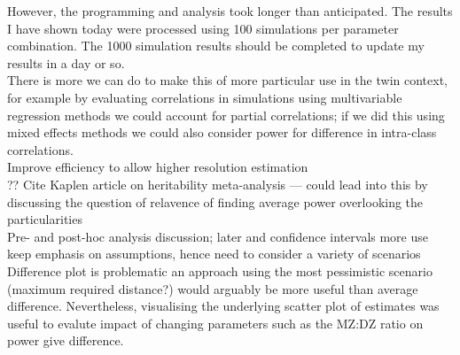 
However, the programming and analysis took longer than anticipated.  The results I have shown today were processed using 100 simulations per parameter combination.  The 1000 simulation results should be completed to update my results in a day or so.
\\
There is more we can do to make this of more particular use in the twin context, for example by evaluating correlations in simulations using multivariable regression methods we could account for partial correlations; if we did this using mixed effects methods we could also consider power for difference in intra-class correlations.
\\
Improve efficiency to allow higher resolution estimation
\\

??
Cite Kaplen article on heritability meta-analysis --- could lead into this by discussing the question of relavence of finding average power overlooking the particularities
\\
Pre- and post-hoc analysis discussion; later and confidence intervals more use
\\
keep emphasis on assumptions, hence need to consider a variety of scenarios
\\

Difference plot is problematic \; an approach using the most pessimistic scenario (maximum required distance?) would arguably be more useful than average difference.  Nevertheless, visualising the underlying scatter plot of estimates was useful to evalute impact of changing parameters such as the MZ:DZ ratio on power give difference.